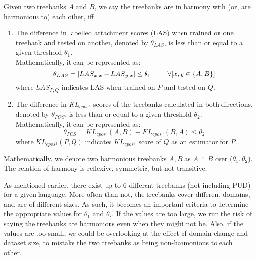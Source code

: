 \theoremstyle{definition}
\begin{definition}
\label{def:harmony}
Given two treebanks \(A\) and \(B\), we say the treebanks are in harmony with (or, are harmonious to) each other, iff
\begin{enumerate}
    \item The difference in labelled attachment scores (LAS) when trained on one treebank and tested on another, denoted by \(\theta_{LAS}\), is less than or equal to a given threshold \(\theta_1\). \\
    Mathematically, it can be represented as:
    \begin{equation}
    \label{eq:deprel_harmony}
        \theta_{LAS} = \vert {LAS}_{x,x} - {LAS}_{y,x} \vert \leq \theta_1 \hspace{5mm} \quad \forall [x, y \in \{A,B\}]
    \end{equation}
    where \(LAS_{P,Q}\) indicates LAS when trained on \(P\) and tested on \(Q\).
    \item The difference in \(KL_{cpos^3}\) scores of the treebanks calculated in both directions, denoted by \(\theta_{POS}\), is less than or equal to a given threshold \(\theta_2\). \\
    Mathematically, it can be represented as:
    \begin{equation}
    \label{eq:pos_harmony}
        \theta_{POS} = KL_{cpos^3}(A,B) + KL_{cpos^3}(B,A) \leq \theta_2
    \end{equation}
    where \(KL_{cpos^3}(P,Q)\) indicates \(KL_{cpos^3}\) score of \(Q\) as an estimator for \(P\).
\end{enumerate}

Mathematically, we denote two harmonious treebanks \(A,B\) as \(A \doteq B\) over (\(\theta_1, \theta_2\)). The relation of harmony is reflexive, symmetric, but not transitive.
\end{definition}

As mentioned earlier, there exist up to 6 different treebanks (not including PUD) for a given language. More often than not, the treebanks cover different domains, and are of different sizes. As such, it becomes an important criteria to determine the appropriate values for \(\theta_{1}\) and \(\theta_{2}\). If the values are too large, we run the risk of saying the treebanks are harmonious even when they might not be. Also, if the values are too small, we could be overlooking at the effect of domain change and dataset size, to mistake the two treebanks as being non-harmonious to each other.

